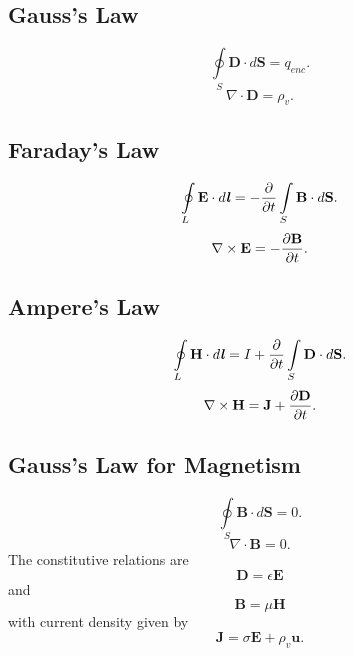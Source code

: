 \documentclass[12pt,a4paper]{article}
\begin{document}
\subsection{Gauss's Law}
\begin{equation}
\oint\limits_{S} \textbf{D}\cdot d\textbf{S}=q_{enc}.
\end{equation}
\begin{equation}
\nabla\cdot\textbf{D}=\rho_v.
\end{equation}
\subsection{Faraday's Law}
\begin{equation}
\oint\limits_{L} \textbf{E}\cdot d\textbf{\textit{l}}=-\dfrac{\partial}{\partial t}\int\limits_{S}\textbf{B}\cdot d\textbf{S}.
\end{equation}
\begin{equation}
\nabla\times\textbf{E}=-\dfrac{\partial\textbf B}{\partial t}.
\end{equation}
\subsection{Ampere's Law}
\begin{equation}
\oint\limits_{L} \textbf{H}\cdot d\textbf{\textit{l}}=I+\dfrac{\partial}{\partial t}\int\limits_{S}\textbf{D}\cdot d\textbf{S}.
\end{equation}
\begin{equation}
\nabla\times\textbf{H}=\textbf{J}+\dfrac{\partial\textbf D}{\partial t}.
\end{equation}
\subsection{Gauss's Law for Magnetism}
\begin{equation}
\oint\limits_{S} \textbf{B}\cdot d\textbf{S}=0.
\end{equation}
\begin{equation}
\nabla\cdot\textbf{B}=0.
\end{equation}
The constitutive relations are
\begin{equation}
\textbf{D}=\epsilon\textbf{E}
\end{equation}
and
\begin{equation}
\textbf{B}=\mu\textbf{H}
\end{equation}
with current density given by
\begin{equation}
\textbf{J}=\sigma\textbf{E}+\rho_v\textbf{u}.
\end{equation}
\end{document}
